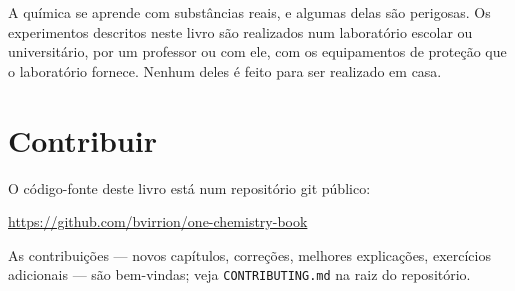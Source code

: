 A química se aprende com substâncias reais, e algumas delas são
perigosas. Os experimentos descritos neste livro são realizados num
laboratório escolar ou universitário, por um professor ou com ele, com
os equipamentos de proteção que o laboratório fornece. Nenhum deles é
feito para ser realizado em casa.

\section*{Contribuir}

O código-fonte deste livro está num repositório git público:
\begin{center}
\url{https://github.com/bvirrion/one-chemistry-book}
\end{center}
As contribuições --- novos capítulos, correções, melhores explicações,
exercícios adicionais --- são bem-vindas; veja \texttt{CONTRIBUTING.md}
na raiz do repositório.
